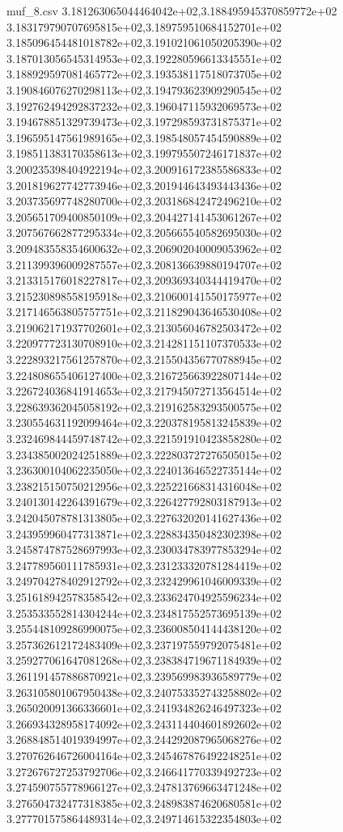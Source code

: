\begin{filecontents*}{muf_8.csv}
3.181263065044464042e+02,3.188495945370859772e+02
3.183179790707695815e+02,3.189759510684152701e+02
3.185096454481018782e+02,3.191021061050205390e+02
3.187013056545314953e+02,3.192280596613345551e+02
3.188929597081465772e+02,3.193538117518073705e+02
3.190846076270298113e+02,3.194793623909290545e+02
3.192762494292837232e+02,3.196047115932069573e+02
3.194678851329739473e+02,3.197298593731875371e+02
3.196595147561989165e+02,3.198548057454590889e+02
3.198511383170358613e+02,3.199795507246171837e+02
3.200235398404922194e+02,3.200916172385586833e+02
3.201819627742773946e+02,3.201944643493443436e+02
3.203735697748280700e+02,3.203186842472496210e+02
3.205651709400850109e+02,3.204427141453061267e+02
3.207567662877295334e+02,3.205665540582695030e+02
3.209483558354600632e+02,3.206902040009053962e+02
3.211399396009287557e+02,3.208136639880194707e+02
3.213315176018227817e+02,3.209369340344419470e+02
3.215230898558195918e+02,3.210600141550175977e+02
3.217146563805757751e+02,3.211829043646530408e+02
3.219062171937702601e+02,3.213056046782503472e+02
3.220977723130708910e+02,3.214281151107370533e+02
3.222893217561257870e+02,3.215504356770788945e+02
3.224808655406127400e+02,3.216725663922807144e+02
3.226724036841914653e+02,3.217945072713564514e+02
3.228639362045058192e+02,3.219162583293500575e+02
3.230554631192099464e+02,3.220378195813245839e+02
3.232469844459748742e+02,3.221591910423858280e+02
3.234385002024251889e+02,3.222803727276505015e+02
3.236300104062235050e+02,3.224013646522735144e+02
3.238215150750212956e+02,3.225221668314316048e+02
3.240130142264391679e+02,3.226427792803187913e+02
3.242045078781313805e+02,3.227632020141627436e+02
3.243959960477313871e+02,3.228834350482302398e+02
3.245874787528697993e+02,3.230034783977853294e+02
3.247789560111785931e+02,3.231233320781284419e+02
3.249704278402912792e+02,3.232429961046009339e+02
3.251618942578358542e+02,3.233624704925596234e+02
3.253533552814304244e+02,3.234817552573695139e+02
3.255448109286990075e+02,3.236008504144438120e+02
3.257362612172483409e+02,3.237197559792075481e+02
3.259277061647081268e+02,3.238384719671184939e+02
3.261191457886870921e+02,3.239569983936589779e+02
3.263105801067950438e+02,3.240753352743258802e+02
3.265020091366336601e+02,3.241934826246497323e+02
3.266934328958174092e+02,3.243114404601892602e+02
3.268848514019394997e+02,3.244292087965068276e+02
3.270762646726004164e+02,3.245467876492248251e+02
3.272676727253792706e+02,3.246641770339492723e+02
3.274590755778966127e+02,3.247813769663471248e+02
3.276504732477318385e+02,3.248983874620680581e+02
3.277701575864489314e+02,3.249714615322354803e+02

\end{filecontents*}
